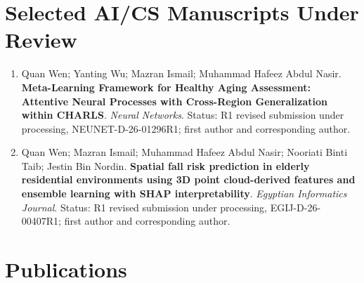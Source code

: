 \documentclass[11pt,a4paper]{article}
\begin{document}
\section*{Selected AI/CS Manuscripts Under Review}
\begin{enumerate}
  \item Quan Wen; Yanting Wu; Mazran Ismail; Muhammad Hafeez Abdul Nasir. \textbf{Meta-Learning Framework for Healthy Aging Assessment: Attentive Neural Processes with Cross-Region Generalization within CHARLS}. \textit{Neural Networks}. Status: R1 revised submission under processing, NEUNET-D-26-01296R1; first author and corresponding author.
  \item Quan Wen; Mazran Ismail; Muhammad Hafeez Abdul Nasir; Nooriati Binti Taib; Jestin Bin Nordin. \textbf{Spatial fall risk prediction in elderly residential environments using 3D point cloud-derived features and ensemble learning with SHAP interpretability}. \textit{Egyptian Informatics Journal}. Status: R1 revised submission under processing, EGIJ-D-26-00407R1; first author and corresponding author.
\end{enumerate}

\section*{Publications}
\end{document}
